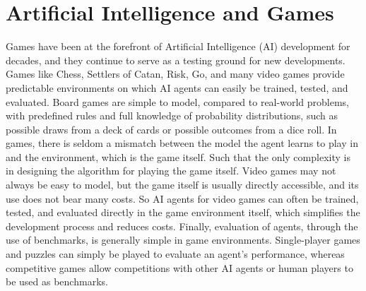 \section{Artificial Intelligence and Games}
\label{sec:introAIandGames}
Games have been at the forefront of Artificial Intelligence (AI) development for decades, and they continue to serve as a testing ground for new developments. 
Games like Chess, Settlers of Catan, Risk, Go, and many video games provide predictable environments on which AI agents can easily be trained, tested, and evaluated. Board games are simple to model, compared to real-world problems, with predefined rules and full knowledge of probability distributions, such as possible draws from a deck of cards or possible outcomes from a dice roll. In games, there is seldom a mismatch between the model the agent learns to play in and the environment, which is the game itself. Such that the only complexity is in designing the algorithm for playing the game itself. Video games may not always be easy to model, but the game itself is usually directly accessible, and its use does not bear many costs. So AI agents for video games can often be trained, tested, and evaluated directly in the game environment itself, which simplifies the development process and reduces costs. Finally, evaluation of agents, through the use of benchmarks, is generally simple in game environments. Single-player games and puzzles can simply be played to evaluate an agent’s performance, whereas competitive games allow competitions with other AI agents or human players to be used as benchmarks.

